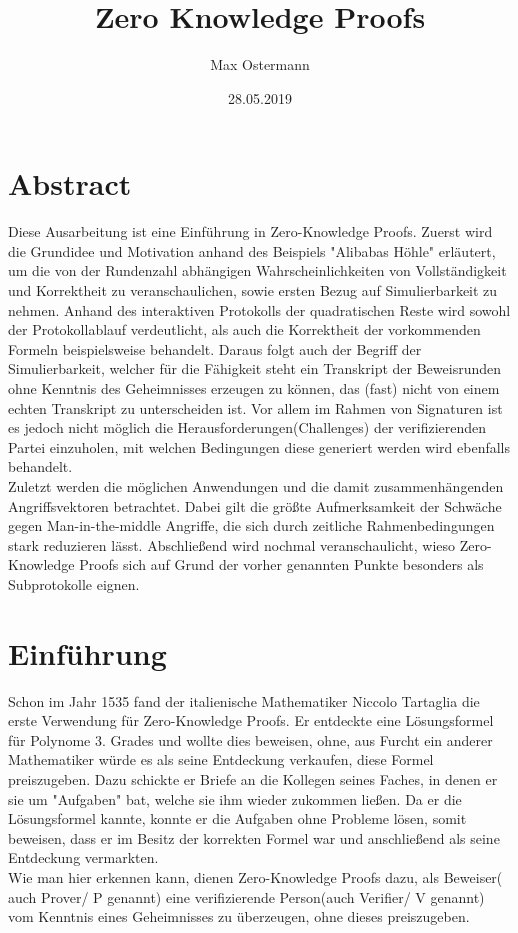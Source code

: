 \documentclass {article}
\title{Zero Knowledge Proofs}
\author{Max Ostermann}
\date{28.05.2019}
\begin{document}
\maketitle
{}
\newpage
{}

\section{Abstract}
Diese Ausarbeitung ist eine Einführung in Zero-Knowledge Proofs.
Zuerst wird die Grundidee und Motivation anhand des Beispiels "Alibabas H\"ohle" erl\"autert, um die von der Rundenzahl abh\"angigen Wahrscheinlichkeiten von Vollst\"andigkeit und Korrektheit zu veranschaulichen, sowie ersten Bezug auf Simulierbarkeit zu nehmen. Anhand des interaktiven Protokolls der quadratischen Reste wird sowohl der Protokollablauf verdeutlicht, als auch die Korrektheit der vorkommenden Formeln beispielsweise behandelt. Daraus folgt auch der Begriff der Simulierbarkeit, welcher für die F\"ahigkeit steht ein Transkript der Beweisrunden ohne Kenntnis des Geheimnisses erzeugen zu können, das (fast) nicht von einem echten Transkript zu unterscheiden ist. Vor allem im Rahmen von Signaturen ist es jedoch nicht m\"oglich die Herausforderungen(Challenges) der verifizierenden Partei einzuholen, mit welchen Bedingungen diese generiert werden wird ebenfalls behandelt. \\
Zuletzt werden die m\"oglichen Anwendungen und die damit zusammenh\"angenden Angriffsvektoren betrachtet. Dabei gilt die gr\"oßte Aufmerksamkeit der Schw\"ache gegen Man-in-the-middle Angriffe, die sich durch zeitliche Rahmenbedingungen stark reduzieren l\"asst. Abschlie\ss{}end wird nochmal veranschaulicht, wieso Zero-Knowledge Proofs sich auf Grund der vorher genannten Punkte besonders als Subprotokolle eignen.


\newpage

\tableofcontents

\newpage 

\section{Einf\"uhrung}

Schon im Jahr 1535 fand der italienische Mathematiker Niccolo Tartaglia die erste Verwendung für Zero-Knowledge Proofs. Er entdeckte eine Lösungsformel für Polynome 3. Grades und wollte dies beweisen, ohne, aus Furcht ein anderer Mathematiker würde es als seine Entdeckung verkaufen, diese Formel preiszugeben. Dazu schickte er Briefe an die Kollegen seines Faches, in denen er sie um "Aufgaben" bat, welche sie ihm wieder zukommen lie\ss{}en. Da er die Lösungsformel kannte, konnte er die Aufgaben ohne Probleme lösen, somit beweisen, dass er im Besitz der korrekten Formel war und anschlie\ss{}end als seine Entdeckung vermarkten. \\
Wie man hier erkennen kann, dienen Zero-Knowledge Proofs dazu, als Beweiser( auch Prover/ P genannt) eine
verifizierende Person(auch Verifier/ V genannt) vom Kenntnis eines Geheimnisses zu überzeugen, ohne dieses preiszugeben.
\end{document}
